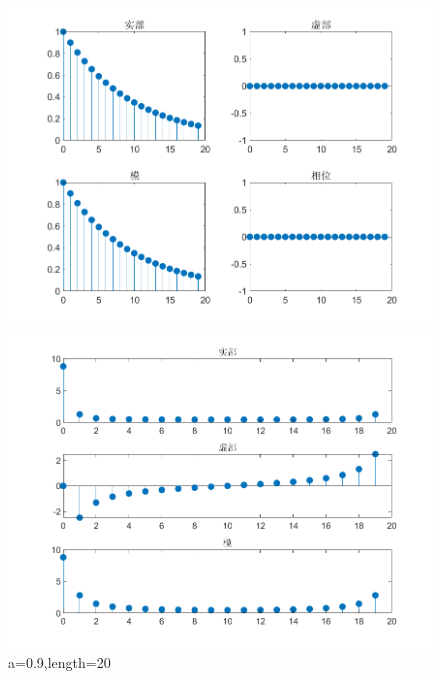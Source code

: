 \documentclass{../source/zjureport}
\begin{document}
                 

                \begin{figure}[H]
                    \centering
                    \begin{minipage}[t]{0.48\textwidth}
                    \centering
                    \includegraphics[width=\textwidth]{figure/实指数序列_a=09,length=20.png}
                    \end{minipage}
                    \begin{minipage}[t]{0.48\textwidth}
                    \centering
                    \includegraphics[width=\textwidth]{figure/频谱_实指数序列_a=09,length=20.png}
                    \end{minipage}
                    \caption{a=0.9,length=20}
                \end{figure}
\end{document}
